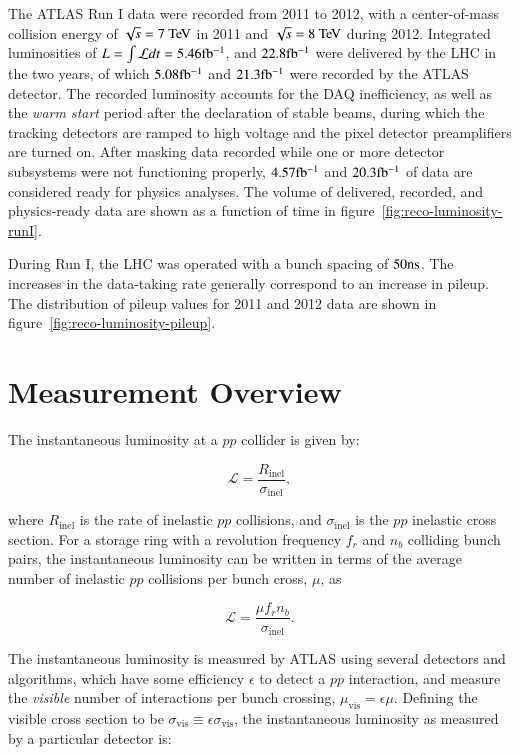The ATLAS Run I data were recorded from 2011 to 2012, with a center-of-mass collision energy of $\sqrt{s}=7 \TeV$ in 2011 and $\sqrt{s}=8 \TeV$ during 2012. Integrated luminosities of $L=\int \mathcal{L} dt=5.46 \mbox{fb$^{-1}$}$, and $22.8 \mbox{fb$^{-1}$}$ were delivered by the LHC in the two years, of which $5.08 \mbox{fb$^{-1}$}$ and $21.3 \mbox{fb$^{-1}$}$ were recorded by the ATLAS detector. The recorded luminosity accounts for the DAQ inefficiency, as well as the \emph{warm start} period after the declaration of stable beams, during which the tracking detectors are ramped to high voltage and the pixel detector preamplifiers are turned on. After masking data recorded while one or more detector subsystems were not functioning properly, $4.57 \mbox{fb$^{-1}$}$ and $20.3 \mbox{fb$^{-1}$}$ of data are considered ready for physics analyses. The volume of delivered, recorded, and physics-ready data are shown as a function of time in figure~\ref{fig:reco-luminosity-runI}. 

During Run I, the LHC was operated with a bunch spacing of $50 \mathrm{ns}$. The increases in the data-taking rate generally correspond to an increase in pileup. The distribution of pileup values for 2011 and 2012 data are shown in figure~\ref{fig:reco-luminosity-pileup}. 



\section{Measurement Overview}\label{sec:luminosity-overview}
The instantaneous luminosity at a $pp$ collider is given by:

\begin{equation}
	\mathcal{L} = \frac{R_{\mathrm{inel}}}{\sigma_{\mathrm{inel}}},
\end{equation}

where $R_{\mathrm{inel}}$ is the rate of inelastic $pp$ collisions, and $\sigma_{\mathrm{inel}}$ is the $pp$ inelastic cross section. For a storage ring with a revolution frequency $f_r$ and $n_b$ colliding bunch pairs, the instantaneous luminosity can be written in terms of the average number of inelastic $pp$ collisions per bunch cross, $\mu$, as 

\begin{equation}
	\mathcal{L} = \frac{\mu f_r n_b}{\sigma_{\mathrm{inel}}}.
\end{equation}

The instantaneous luminosity is measured by ATLAS using several detectors and algorithms, which have some efficiency $\epsilon$ to detect a $pp$ interaction, and measure the \emph{visible} number of interactions per bunch crossing, $\mu_{\mathrm{vis}} = \epsilon \mu$. Defining the visible cross section to be $\sigma_{\mathrm{vis}}\equiv \epsilon \sigma_{\mathrm{vis}}$, the instantaneous luminosity as measured by a particular detector is:

